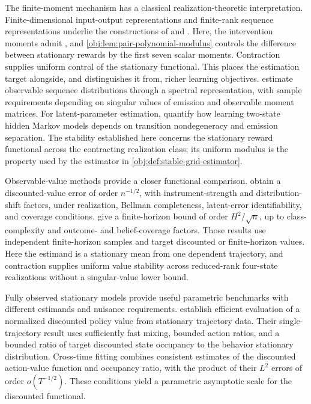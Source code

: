 The finite-moment mechanism has a classical realization-theoretic interpretation. Finite-dimensional input-output representations and finite-rank sequence representations underlie the constructions of \citet[pp.\ 545--548]{Ho1966} and \citet[pp.\ 26--40]{Carlyle1971}. Here, the intervention moments admit , and \cref{obj:lem:pair-polynomial-modulus} controls the difference between stationary rewards by the first seven scalar moments. Contraction supplies uniform control of the stationary functional. This places the estimation target alongside, and distinguishes it from, richer learning objectives. \citet[Condition 1 and Theorem 6]{HsuKakadeZhang2012} estimate observable sequence distributions through a spectral representation, with sample requirements depending on singular values of emission and observable moment matrices. For latent-parameter estimation, \citet[Theorem 1 and Corollary 1]{AbrahamGassiatNaulet2023} quantify how learning two-state hidden Markov models depends on transition nondegeneracy and emission separation. The stability established here concerns the stationary reward functional across the contracting realization class; its uniform modulus is the property used by the estimator in \cref{obj:def:stable-grid-estimator}.

Observable-value methods provide a closer functional comparison. \citet[Theorem 3]{Uehara2023} obtain a discounted-value error of order \(n^{-1/2}\), with instrument-strength and distribution-shift factors, under realization, Bellman completeness, latent-error identifiability, and coverage conditions. \citet[Theorem 7]{Zhang2024} give a finite-horizon bound of order \(H^2/\sqrt n\), up to class-complexity and outcome- and belief-coverage factors. Those results use independent finite-horizon samples and target discounted or finite-horizon values. Here the estimand is a stationary mean from one dependent trajectory, and contraction supplies uniform value stability across reduced-rank four-state realizations without a singular-value lower bound.

Fully observed stationary models provide useful parametric benchmarks with different estimands and nuisance requirements. \citet[Section 4 and Theorem 12]{KallusUehara2022} establish efficient evaluation of a normalized discounted policy value from stationary trajectory data. Their single-trajectory result uses sufficiently fast mixing, bounded action ratios, and a bounded ratio of target discounted state occupancy to the behavior stationary distribution. Cross-time fitting combines consistent estimates of the discounted action-value function and occupancy ratio, with the product of their \(L^2\) errors of order \(o(T^{-1/2})\). These conditions yield a parametric asymptotic scale for the discounted functional.

